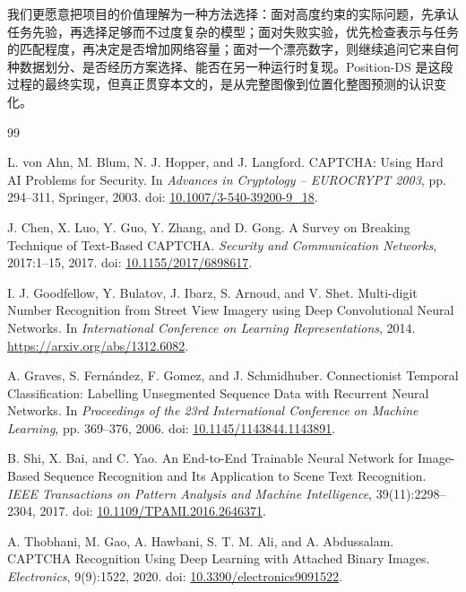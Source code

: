 \documentclass[UTF8,12pt,a4paper]{ctexart}
\begin{document}
我们更愿意把项目的价值理解为一种方法选择：面对高度约束的实际问题，先承认任务先验，再选择足够而不过度复杂的模型；面对失败实验，优先检查表示与任务的匹配程度，再决定是否增加网络容量；面对一个漂亮数字，则继续追问它来自何种数据划分、是否经历方案选择、能否在另一种运行时复现。Position-DS 是这段过程的最终实现，但真正贯穿本文的，是从完整图像到位置化整图预测的认识变化。

\clearpage
{}
\begin{thebibliography}{99}

L. von Ahn, M. Blum, N. J. Hopper, and J. Langford.
\newblock CAPTCHA: Using Hard AI Problems for Security.
\newblock In \emph{Advances in Cryptology -- EUROCRYPT 2003}, pp. 294--311, Springer, 2003.
\newblock doi: \href{https://doi.org/10.1007/3-540-39200-9_18}{10.1007/3-540-39200-9\_18}.

J. Chen, X. Luo, Y. Guo, Y. Zhang, and D. Gong.
\newblock A Survey on Breaking Technique of Text-Based CAPTCHA.
\newblock \emph{Security and Communication Networks}, 2017:1--15, 2017.
\newblock doi: \href{https://doi.org/10.1155/2017/6898617}{10.1155/2017/6898617}.

I. J. Goodfellow, Y. Bulatov, J. Ibarz, S. Arnoud, and V. Shet.
\newblock Multi-digit Number Recognition from Street View Imagery using Deep Convolutional Neural Networks.
\newblock In \emph{International Conference on Learning Representations}, 2014.
\newblock \url{https://arxiv.org/abs/1312.6082}.

A. Graves, S. Fern\'andez, F. Gomez, and J. Schmidhuber.
\newblock Connectionist Temporal Classification: Labelling Unsegmented Sequence Data with Recurrent Neural Networks.
\newblock In \emph{Proceedings of the 23rd International Conference on Machine Learning}, pp. 369--376, 2006.
\newblock doi: \href{https://doi.org/10.1145/1143844.1143891}{10.1145/1143844.1143891}.

B. Shi, X. Bai, and C. Yao.
\newblock An End-to-End Trainable Neural Network for Image-Based Sequence Recognition and Its Application to Scene Text Recognition.
\newblock \emph{IEEE Transactions on Pattern Analysis and Machine Intelligence}, 39(11):2298--2304, 2017.
\newblock doi: \href{https://doi.org/10.1109/TPAMI.2016.2646371}{10.1109/TPAMI.2016.2646371}.

A. Thobhani, M. Gao, A. Hawbani, S. T. M. Ali, and A. Abdussalam.
\newblock CAPTCHA Recognition Using Deep Learning with Attached Binary Images.
\newblock \emph{Electronics}, 9(9):1522, 2020.
\newblock doi: \href{https://doi.org/10.3390/electronics9091522}{10.3390/electronics9091522}.


\end{thebibliography}
\end{document}
